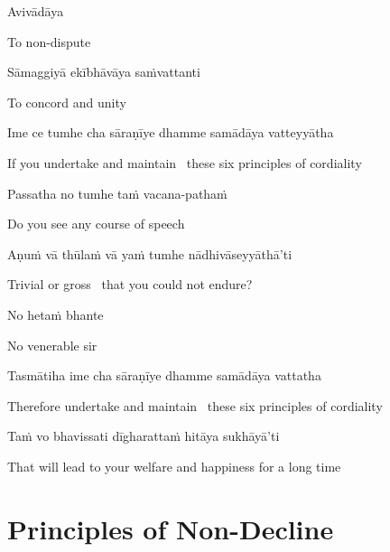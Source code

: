 Avivādāya

\begin{cprenglish}
  To non-dispute
\end{cprenglish}

Sāmaggiyā ekībhāvāya saṁvattanti

\begin{cprenglish}
  To concord and unity
\end{cprenglish}

\suttaRef{[MN 48]}

Ime ce tumhe cha sāraṇīye dhamme samādāya vatteyyātha

\begin{cprenglish}
  If you undertake and maintain \breathmark\ these six principles of cordiality
\end{cprenglish}

Passatha no tumhe taṁ vacana-pathaṁ

\begin{cprenglish}
  Do you see any course of speech
\end{cprenglish}

Aṇuṁ vā thūlaṁ vā yaṁ tumhe nādhivāseyyāthā’ti

\begin{cprenglish}
  Trivial or gross \breathmark\ that you could not endure?
\end{cprenglish}

No hetaṁ bhante

\begin{cprenglish}
  No venerable sir
\end{cprenglish}

Tasmātiha ime cha sāraṇīye dhamme samādāya vattatha

\begin{cprenglish}
  Therefore undertake and maintain \breathmark\ these six principles of cordiality
\end{cprenglish}

Taṁ vo bhavissati dīgharattaṁ hitāya sukhāyā’ti

\begin{cprenglish}
  That will lead to your welfare and happiness for a long time
\end{cprenglish}

\suttaRef{[MN 104]}

\clearpage

\section{Principles of Non-Decline}
\label{principles-of-non-decline}

